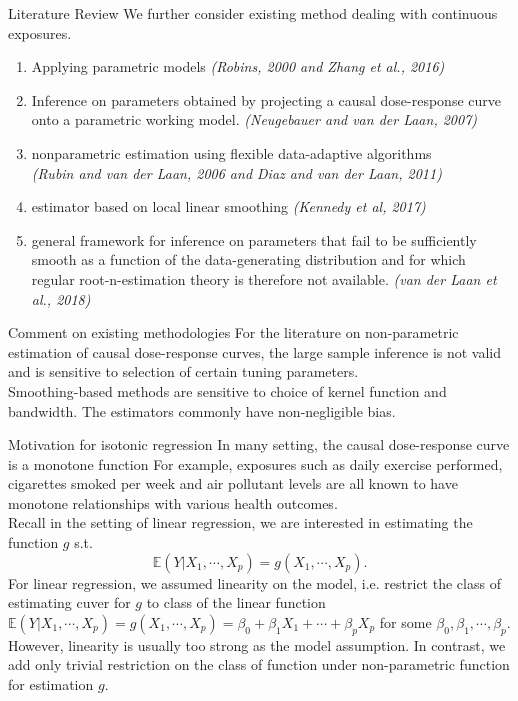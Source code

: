 \documentclass{beamer}
\newcommand{\E}{\mathbb{E}}
\begin{document}
\begin{frame}{Literature Review}
We further consider existing method dealing with continuous exposures.
	\begin{enumerate}
		\item Applying parametric models \textit{(Robins, 2000 and Zhang et al., 2016)}

		\item Inference on parameters obtained by projecting a causal dose-response curve onto a parametric working model. \textit{(Neugebauer and van der Laan, 2007)}

		\item nonparametric	estimation using flexible data-adaptive algorithms\\
		\textit{(Rubin and van der Laan, 2006 and Diaz and van der Laan, 2011)}

		\item estimator based on local linear smoothing
		\textit{(Kennedy et al, 2017)}

		\item general framework for inference on parameters that fail to be sufficiently smooth as a function of the data-generating distribution and for which regular root-n-estimation theory is therefore not available.
		\textit{(van der Laan et al., 2018)}
	\end{enumerate}

\end{frame}

\begin{frame}{Comment on existing methodologies}
	For the literature on non-parametric estimation of causal dose-response curves, the large sample inference is not valid and is sensitive to selection of certain tuning parameters.\\
	Smoothing-based methods are sensitive to choice of kernel function and bandwidth. The estimators commonly have non-negligible bias.

\end{frame}

\begin{frame}{Motivation for isotonic regression}
   In many setting, the causal dose-response curve is a monotone function For example, exposures such as daily exercise performed, cigarettes smoked per week
   and air pollutant levels are all known to have monotone relationships with various health outcomes.\\
   Recall in the setting of linear regression, we are interested in estimating the function $g$ s.t.
   $$
   \E(Y|X_1,\cdots,X_p)=g(X_1,\cdots,X_p).
   $$
   For linear regression, we assumed linearity on the model, i.e. restrict the class of estimating cuver for $g$ to class of the linear function $\E(Y|X_1,\cdots,X_p)=g(X_1,\cdots,X_p)=\beta_0+\beta_1 X_1+\cdots+\beta_pX_p$ for some $\beta_0,\beta_1,\cdots,\beta_p$. However, linearity is usually too strong as the model assumption. In contrast, we add only trivial restriction on the class of function under non-parametric function for estimation $g$.
\end{frame}
\end{document}
